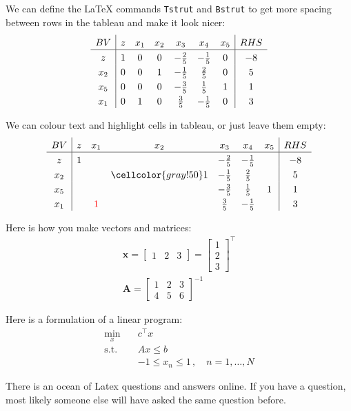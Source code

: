 We can define the \LaTeX{} commands \texttt{Tstrut} and \texttt{Bstrut} to get more spacing between rows in the tableau and make it look nicer:
\begin{align}
    \begin{array}{c | cccccc | c}
         BV  & z & x_1 & x_2 & x_3 & x_4 & x_5 & RHS \Tstrut\Bstrut \\ 
         \hline
         z   & 1 & 0 & 0 & -\tfrac{2}{5} & -\tfrac{1}{5} & 0 & -8 \Tstrut\Bstrut \\
         x_2 & 0 & 0 & 1 & -\tfrac{1}{5} & \tfrac{2}{5}  & 0 & 5  \Tstrut\Bstrut \\
         x_5 & 0 & 0 & 0 & -\tfrac{3}{5} & \tfrac{1}{5}  & 1 & 1  \Tstrut\Bstrut \\
         x_1 & 0 & 1 & 0 & \tfrac{3}{5}  & -\tfrac{1}{5} & 0 & 3  \Tstrut\Bstrut
    \end{array}
\end{align}

We can colour text and highlight cells in tableau, or just leave them empty:
\begin{align}
    \begin{array}{c | cccccc | c}
         BV  & z & x_1 & x_2 & x_3 & x_4 & x_5 & RHS \Tstrut\Bstrut \\ 
         \hline
         z   & 1 & & & -\tfrac{2}{5} & -\tfrac{1}{5} & & -8 \Tstrut\Bstrut \\
         x_2 & & & \cellcolor{gray!50}1 & -\tfrac{1}{5} & \tfrac{2}{5} & & 5 \Tstrut\Bstrut \\
         x_5 & & & & -\tfrac{3}{5} & \tfrac{1}{5}  & 1 & 1 \Tstrut\Bstrut \\
         x_1 & & \textcolor{red}{1} & & \tfrac{3}{5}  & -\tfrac{1}{5} & & 3 \Tstrut\Bstrut
    \end{array}
\end{align}

Here is how you make vectors and matrices:
\begin{align}
    \mathbf x = \begin{bmatrix} 1 & 2 & 3 \end{bmatrix} = \begin{bmatrix} 1 \\ 2 \\ 3 \end{bmatrix}^\top \\
    \mathbf A = \begin{bmatrix} 1 & 2 & 3 \\ 4 & 5 & 6 \end{bmatrix}^{-1}
\end{align}

Here is a formulation of a linear program:
\begin{align*}
    \min_{x} \quad & c^\top x \\
    \mathrm{s.t.} \quad 
    & A x \leq b \\
    &-1 \leq x_n \leq 1 \,, \quad n = 1, \dots, N
\end{align*}

There is an ocean of Latex questions and answers online. If you have a question, most likely someone else will have asked the same question before. 